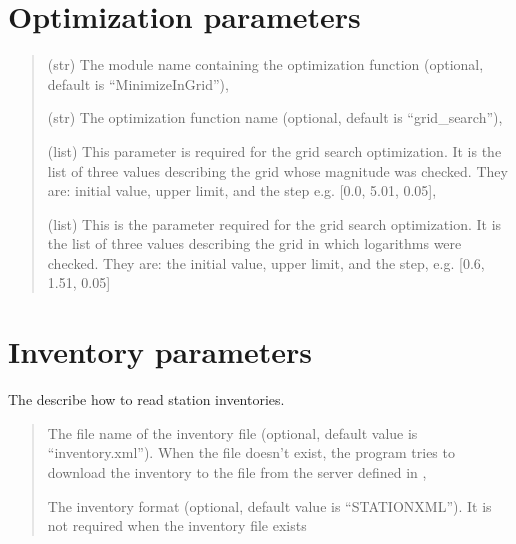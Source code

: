 \documentclass[letterpaper,10pt,english]{sphinxmanual}
\begin{document}
\section{Optimization parameters}
\label{\detokenize{configuration:optimization-parameters}}\begin{quote}\begin{description}
\sphinxAtStartPar
(str) The module name containing the optimization function (optional, default is “MinimizeInGrid”),

\sphinxAtStartPar
(str) The optimization function name (optional, default is “grid\_search”),

\sphinxAtStartPar
(list) This parameter is required for the grid search optimization.
It is the list of three values describing the grid whose magnitude was checked.
They are: initial value, upper limit, and the step e.g.  {[}0.0, 5.01, 0.05{]},

\sphinxAtStartPar
(list) This is the parameter required for the grid search optimization.
It is the list of three values describing the grid in which logarithms were checked.
They are: the initial value, upper limit, and the step, e.g. {[}\sphinxhyphen{}0.6, 1.51, 0.05{]}

\end{description}\end{quote}


\section{Inventory parameters}
\label{\detokenize{configuration:inventory-parameters}}
\sphinxAtStartPar
The  describe how to read station inventories.
\begin{quote}\begin{description}
\sphinxAtStartPar
The file name of the inventory file (optional, default value is “inventory.xml”).
When the file doesn’t exist, the program tries to download the inventory to the file
from the server defined in {\hyperref[\detokenize{configuration:stream-parameters}]{}},

\sphinxAtStartPar
The inventory format (optional, default value is “STATIONXML”).
It is not required when the inventory file exists

\end{description}\end{quote}
\end{document}
